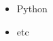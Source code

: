 \documentclass{eab-cv}
\begin{document}
\maketitle

\starttimeline
{}
\timelinespacer
{}
\stoptimeline

\begin{itemize}
    \item Python
    \item etc
\end{itemize}
\end{document}

